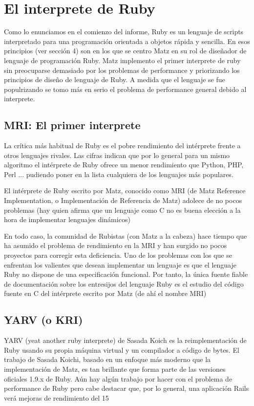 \documentclass{article}
\begin{document}
\section{El interprete de Ruby}

Como lo enunciamos en el comienzo del informe, Ruby es un lenguaje de scripts interpretado para una programación orientada a objetos rápida y sencilla. En esos principios (ver sección 4) son en los que se centro Matz en su rol de diseñador de lenguaje de programación Ruby. Matz implemento el primer interprete de ruby sin preocuparse demasiado por los problemas de performance y priorizando los principios de diseño de lenguaje de Ruby. A medida que el lenguaje se fue populrizando se tomo más en serio el problema de performance general debido al interprete.

\subsection{MRI: El primer interprete}

La crítica más habitual de Ruby es el pobre rendimiento del intérprete frente a otros lenguajes rivales. Las cifras indican que por lo general para un mismo algoritmo el intérprete de Ruby ofrece un menor rendimiento que Python, PHP, Perl ... pudiendo poner en la lista cualquiera de los lenguajes más populares.

 El intérprete de Ruby escrito por Matz, conocido como MRI (de Matz Reference Implementation, o Implementación de Referencia de Matz) adolece de no pocos problemas (hay quien afirma que un lenguaje como C no es buena elección a la hora de implementar lenguajes dinámicos)

En todo caso, la comunidad de Rubistas (con Matz a la cabeza) hace tiempo que ha asumido el problema de rendimiento en la MRI y han surgido no pocos proyectos para corregir esta deficiencia. Uno de los problemas con los que se enfrentan los valientes que desean implementar un lenguaje es que el lenguaje Ruby no dispone de una especificación funcional. Por tanto, la única fuente fiable de documentación sobre los entresijos del lenguaje Ruby es el estudio del código fuente en C del intérprete escrito por Matz (de ahí el nombre MRI)


\subsection{YARV (o KRI)}

YARV (yeat another ruby interprete) de Sasada Koich es  la reimplementación de Ruby usando su propia máquina virtual y un compilador a código de bytes. El trabajo de Sasada Koichi, basado en un enfoque más moderno que la implementación de Matz, es tan brillante que forma parte de las versiones oficiales 1.9.x de Ruby. Aún hay algún trabajo por hacer con el problema de performance de Ruby pero cabe destacar que, por lo general, una aplicación Rails verá mejoras de rendimiento del 15%
\end{document}
